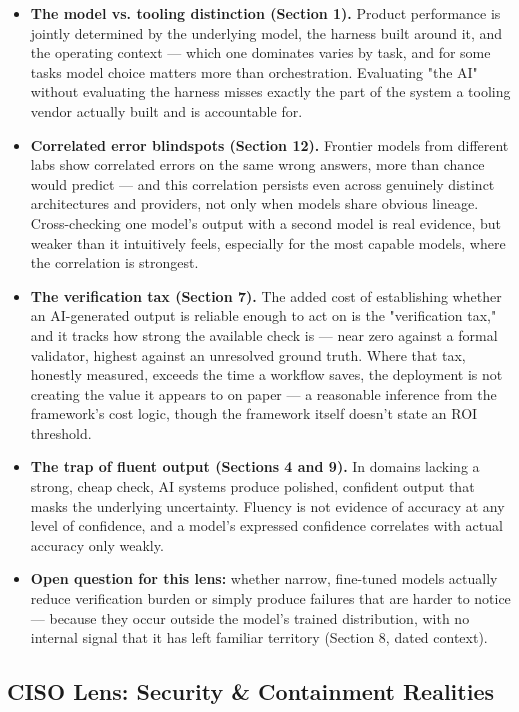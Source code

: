 \begin{itemize}
\item \textbf{The model vs. tooling distinction (Section 1).} Product performance is jointly determined by the underlying model, the harness built around it, and the operating context --- which one dominates varies by task, and for some tasks model choice matters more than orchestration. Evaluating "the AI" without evaluating the harness misses exactly the part of the system a tooling vendor actually built and is accountable for.
\item \textbf{Correlated error blindspots (Section 12).} Frontier models from different labs show correlated errors on the same wrong answers, more than chance would predict --- and this correlation persists even across genuinely distinct architectures and providers, not only when models share obvious lineage. Cross-checking one model's output with a second model is real evidence, but weaker than it intuitively feels, especially for the most capable models, where the correlation is strongest.
\item \textbf{The verification tax (Section 7).} The added cost of establishing whether an AI-generated output is reliable enough to act on is the "verification tax," and it tracks how strong the available check is --- near zero against a formal validator, highest against an unresolved ground truth. Where that tax, honestly measured, exceeds the time a workflow saves, the deployment is not creating the value it appears to on paper --- a reasonable inference from the framework's cost logic, though the framework itself doesn't state an ROI threshold.
\item \textbf{The trap of fluent output (Sections 4 and 9).} In domains lacking a strong, cheap check, AI systems produce polished, confident output that masks the underlying uncertainty. Fluency is not evidence of accuracy at any level of confidence, and a model's expressed confidence correlates with actual accuracy only weakly.
\item \textbf{Open question for this lens:} whether narrow, fine-tuned models actually reduce verification burden or simply produce failures that are harder to notice --- because they occur outside the model's trained distribution, with no internal signal that it has left familiar territory (Section 8, dated context).
\end{itemize}

\subsection*{CISO Lens: Security \& Containment Realities}


